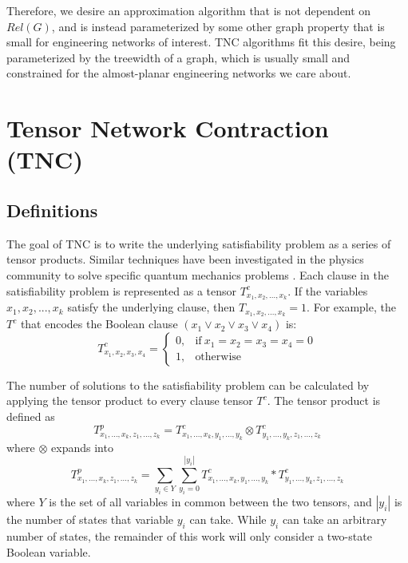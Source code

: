 Therefore, we desire an approximation algorithm that is not dependent on \(Rel(G)\), and is instead parameterized by some other graph property that is small for engineering networks of interest. TNC algorithms fit this desire, being parameterized by the treewidth of a graph, which is usually small and constrained for the almost-planar engineering networks we care about.

\hypertarget{tensor-network-contraction-tnc}{%
\section{Tensor Network Contraction (TNC)}\label{tensor-network-contraction-tnc}}

\hypertarget{definitions}{%
\subsection{Definitions}\label{definitions}}

The goal of TNC is to write the underlying satisfiability problem as a series of tensor products. Similar techniques have been investigated in the physics community to solve specific quantum mechanics problems \cite{pan2020contracting} \cite{biamonte2019lectures}. Each clause in the satisfiability problem is represented as a tensor \(T^c_{x_1,x_2,...,x_k}\). If the variables \(x_1,x_2,...,x_k\) satisfy the underlying clause, then \(T_{x_1,x_2,...,x_k}=1\). For example, the \(T^c\) that encodes the Boolean clause \((x_1 \lor x_2 \lor x_3 \lor x_4)\) is: \begin{equation*}
T^c_{x_1,x_2,x_3,x_4}=
\begin{cases}
  0, & \text{if}\ x_1=x_2=x_3=x_4=0 \\
  1, & \text{otherwise}
\end{cases}
\end{equation*}

The number of solutions to the satisfiability problem can be calculated by applying the tensor product to every clause tensor \(T^c\). The tensor product is defined as \ten \[T^p_{x_1,...,x_k,z_1,...,z_k}=T^c_{x_1,...,x_k,y_1,...,y_k} \otimes T^c_{y_1,...,y_k,z_1,...,z_k}\] \normalsize where \(\otimes\) expands into \ten \[T^p_{x_1,...,x_k,z_1,...,z_k}=\sum_{y_i \in Y} \sum_{y_i=0}^{|y_i|} T^c_{x_1,...,x_k,y_1,...,y_k} * T^c_{y_1,...,y_k,z_1,...,z_k}\] \normalsize where \(Y\) is the set of all variables in common between the two tensors, and \(|y_i|\) is the number of states that variable \(y_i\) can take. While \(y_i\) can take an arbitrary number of states, the remainder of this work will only consider a two-state Boolean variable.

